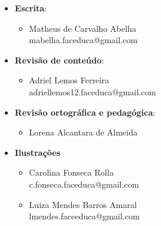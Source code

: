 \begin{itemize}
    \item \textbf{Escrita}:
        \begin{itemize}
          \item Matheus de Carvalho Abelha\\ mabelha.faceduca@gmail.com
        \end{itemize}
    \item \textbf{Revisão de conteúdo}:
        \begin{itemize}
            \item Adriel Lemos Ferreira\\
            adriellemos12.faceduca@gmail.com
        \end{itemize}
    \item \textbf{Revisão ortográfica e pedagógica}:
        \begin{itemize}
            \item Lorena Alcantara de Almeida
        \end{itemize}    
    \item \textbf{Ilustrações}
        \begin{itemize}
            \item Carolina Fonseca Rolla\\
            c.fonseca.faceduca@gmail.com
            \item Luiza Mendes Barros Amaral\\
            lmendes.faceeduca@gmail.com
        \end{itemize}
\end{itemize}

